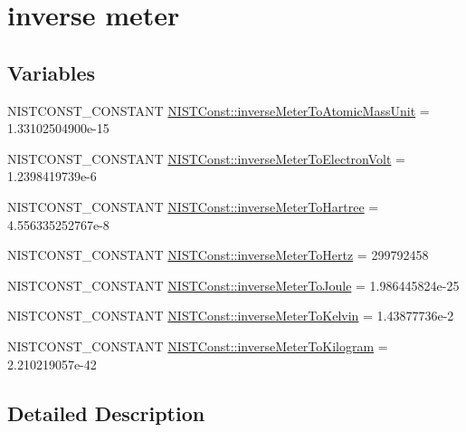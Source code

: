 \hypertarget{group___n_i_s_t_const-_inverse_meter}{}\section{inverse meter}
\label{group___n_i_s_t_const-_inverse_meter}
\subsection*{Variables}
\begin{DoxyCompactItemize}
\item 
N\+I\+S\+T\+C\+O\+N\+S\+T\+\_\+\+C\+O\+N\+S\+T\+A\+NT \mbox{\hyperlink{group___n_i_s_t_const-_inverse_meter_ga2335ec627cd827e650915220a28de0ea}{N\+I\+S\+T\+Const\+::inverse\+Meter\+To\+Atomic\+Mass\+Unit}} = 1.\+33102504900e-\/15
\item 
N\+I\+S\+T\+C\+O\+N\+S\+T\+\_\+\+C\+O\+N\+S\+T\+A\+NT \mbox{\hyperlink{group___n_i_s_t_const-_inverse_meter_ga57a5a7477b4e1251095b87b5ff791f40}{N\+I\+S\+T\+Const\+::inverse\+Meter\+To\+Electron\+Volt}} = 1.\+2398419739e-\/6
\item 
N\+I\+S\+T\+C\+O\+N\+S\+T\+\_\+\+C\+O\+N\+S\+T\+A\+NT \mbox{\hyperlink{group___n_i_s_t_const-_inverse_meter_gabe453ddc5bf74b907780fe467fd71be3}{N\+I\+S\+T\+Const\+::inverse\+Meter\+To\+Hartree}} = 4.\+556335252767e-\/8
\item 
N\+I\+S\+T\+C\+O\+N\+S\+T\+\_\+\+C\+O\+N\+S\+T\+A\+NT \mbox{\hyperlink{group___n_i_s_t_const-_inverse_meter_gac30744595d38ad98b32d53785d7c7b82}{N\+I\+S\+T\+Const\+::inverse\+Meter\+To\+Hertz}} = 299792458
\item 
N\+I\+S\+T\+C\+O\+N\+S\+T\+\_\+\+C\+O\+N\+S\+T\+A\+NT \mbox{\hyperlink{group___n_i_s_t_const-_inverse_meter_ga0f2df9b1aa4e70e96cec81157c3763be}{N\+I\+S\+T\+Const\+::inverse\+Meter\+To\+Joule}} = 1.\+986445824e-\/25
\item 
N\+I\+S\+T\+C\+O\+N\+S\+T\+\_\+\+C\+O\+N\+S\+T\+A\+NT \mbox{\hyperlink{group___n_i_s_t_const-_inverse_meter_ga93686714f6a2c3aa4c4abd65192a7b40}{N\+I\+S\+T\+Const\+::inverse\+Meter\+To\+Kelvin}} = 1.\+43877736e-\/2
\item 
N\+I\+S\+T\+C\+O\+N\+S\+T\+\_\+\+C\+O\+N\+S\+T\+A\+NT \mbox{\hyperlink{group___n_i_s_t_const-_inverse_meter_ga1af6b6d7784fde9e08c81c3e801a2f9d}{N\+I\+S\+T\+Const\+::inverse\+Meter\+To\+Kilogram}} = 2.\+210219057e-\/42
\end{DoxyCompactItemize}


\subsection{Detailed Description}


